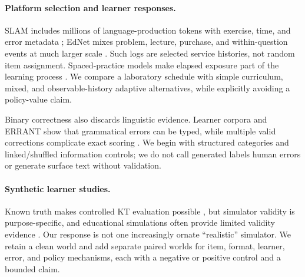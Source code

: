 \paragraph{Platform selection and learner responses.}
SLAM includes millions of language-production tokens with exercise, time, and
error metadata \citep{settles-etal-2018}; EdNet mixes problem, lecture,
purchase, and within-question events at much larger scale
\citep{choi-etal-2020}.  Such logs are selected service histories, not random
item assignment.  Spaced-practice models make elapsed exposure part of the
learning process \citep{settles-meeder-2016}.  We compare a laboratory schedule
with simple curriculum, mixed, and observable-history adaptive alternatives,
while explicitly avoiding a policy-value claim.

Binary correctness also discards linguistic evidence.  Learner corpora and
ERRANT show that grammatical errors can be typed, while multiple valid
corrections complicate exact scoring \citep{bryant-etal-2017,bryant-etal-2019}.
We begin with structured categories and linked/shuffled information controls;
we do not call generated labels human errors or generate surface text without
validation.

\paragraph{Synthetic learner studies.}
Known truth makes controlled KT evaluation possible
\citep{piech-etal-2015,pagonis-etal-2024}, but simulator validity is
purpose-specific, and educational simulations often provide limited validity
evidence \citep{kaser-alexandron-2024}.  Our response is not one increasingly
ornate ``realistic'' simulator.  We retain a clean world and add separate paired
worlds for item, format, learner, error, and policy mechanisms, each with a
negative or positive control and a bounded claim.
